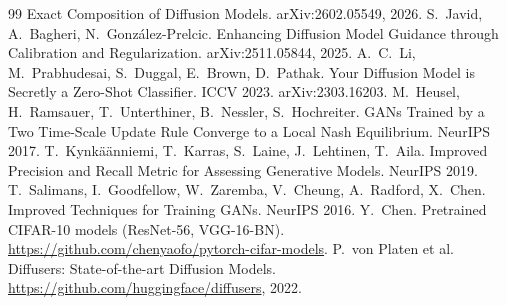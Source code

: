 \documentclass[11pt]{article}
\begin{document}
\begin{thebibliography}{99}
  Exact Composition of Diffusion Models. arXiv:2602.05549, 2026.
 S.~Javid, A.~Bagheri, N.~Gonz\'alez-Prelcic. Enhancing Diffusion Model Guidance through Calibration
  and Regularization. arXiv:2511.05844, 2025.
 A.~C.~Li, M.~Prabhudesai, S.~Duggal, E.~Brown, D.~Pathak. Your Diffusion Model is Secretly a
  Zero-Shot Classifier. ICCV 2023. arXiv:2303.16203.
 M.~Heusel, H.~Ramsauer, T.~Unterthiner, B.~Nessler, S.~Hochreiter. GANs Trained by a Two Time-Scale
  Update Rule Converge to a Local Nash Equilibrium. NeurIPS 2017.
 T.~Kynk\"a\"anniemi, T.~Karras, S.~Laine, J.~Lehtinen, T.~Aila. Improved Precision and Recall Metric
  for Assessing Generative Models. NeurIPS 2019.
 T.~Salimans, I.~Goodfellow, W.~Zaremba, V.~Cheung, A.~Radford, X.~Chen. Improved Techniques for
  Training GANs. NeurIPS 2016.
 Y.~Chen. Pretrained CIFAR-10 models (ResNet-56, VGG-16-BN).
  \url{https://github.com/chenyaofo/pytorch-cifar-models}.
 P.~von Platen et al. Diffusers: State-of-the-art Diffusion Models.
  \url{https://github.com/huggingface/diffusers}, 2022.
\end{thebibliography}
\end{document}
